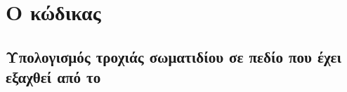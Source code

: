 \chapter{Ο κώδικας }

\section{Υπολογισμός τροχιάς σωματιδίου σε πεδίο που έχει εξαχθεί από το }












